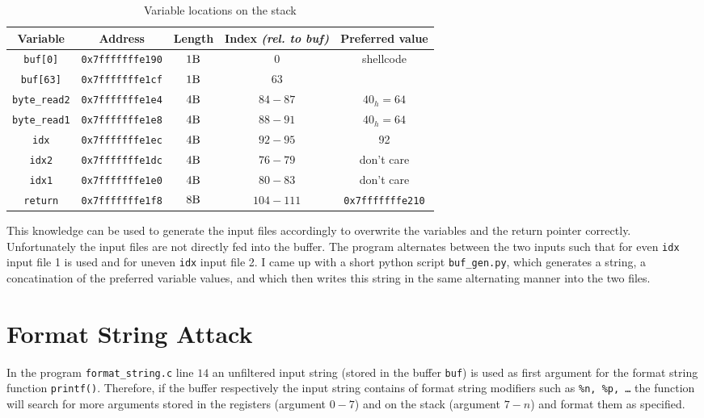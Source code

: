 \documentclass[12pt]{article}
\begin{document}
\begin{table}[H]
	\begin{tabular}{c|cccc}
		\textbf{Variable} & \textbf{Address} & \textbf{Length} & \textbf{Index \textit{(rel. to buf)}} & \textbf{Preferred value} \\
		\hline
		\texttt{buf[0]} & \texttt{0x7fffffffe190} & $1\si{\byte}$ & $0$ & \multirow{2}{*}{shellcode}\\
		\texttt{buf[63]} & \texttt{0x7fffffffe1cf} & $1\si{\byte}$ & $63$ & \\
		\texttt{byte\_read2} & \texttt{0x7fffffffe1e4} & $4\si{\byte}$ & $84-87$ &$40_h = 64$ \\
		\texttt{byte\_read1} & \texttt{0x7fffffffe1e8} & $4\si{\byte}$ & $88-91$ &$40_h = 64$ \\
		\texttt{idx} & \texttt{0x7fffffffe1ec} & $4\si{\byte}$ & $92-95$ & 92\\
		\texttt{idx2} & \texttt{0x7fffffffe1dc} & $4\si{\byte}$ & $76-79$ & don't care\\
		\texttt{idx1} & \texttt{0x7fffffffe1e0} & $4\si{\byte}$ & $80-83$ & don't care\\
		\texttt{return} & \texttt{0x7fffffffe1f8} & $8\si{\byte}$ & $104-111$ & \texttt{0x7fffffffe210} \\
	\end{tabular}
	\caption{Variable locations on the stack}
	\label{stack}
\end{table}

This knowledge can be used to generate the input files accordingly to overwrite the variables and the return pointer correctly. 
Unfortunately the input files are not directly fed into the buffer. The program alternates between the two inputs such that for even \texttt{idx} input file 1 is used and for uneven \texttt{idx} input file 2.
I came up with a short python script \texttt{buf\_gen.py}, which generates a string, a concatination of the preferred variable values, and which then writes this string in the same alternating manner into the two files.



\newpage
\section{Format String Attack}
In the program \texttt{format\_string.c} line $14$ an unfiltered input string (stored in the buffer \texttt{buf}) is used as first argument for the format string function \texttt{printf()}.
Therefore, if the buffer respectively the input string contains of format string modifiers such as \texttt{\%n, \%p, \dots} the function will search for more arguments stored in the registers (argument $0-7$) and on the stack (argument $7-n$) and format them as specified. 
\end{document}
